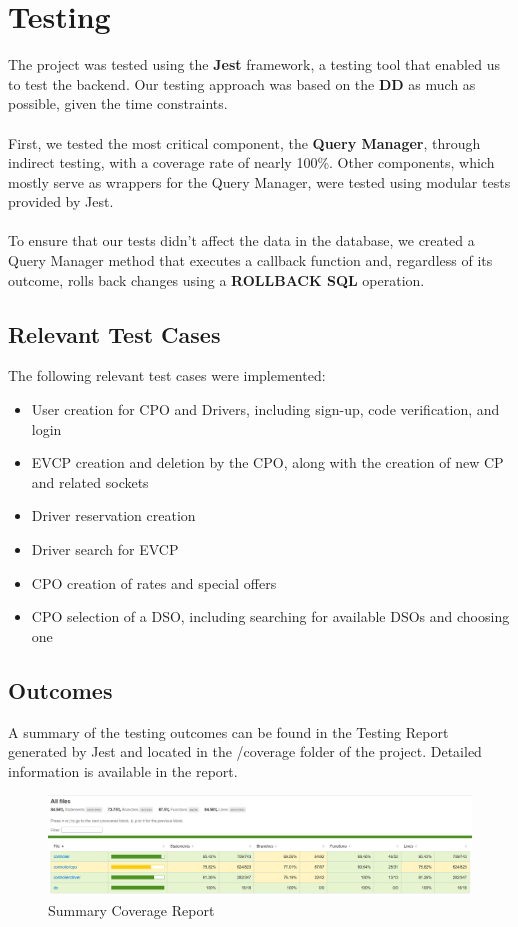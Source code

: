 \section{Testing}

The project was tested using the \textbf{Jest} framework, a testing tool that enabled us to test the backend.
Our testing approach was based on the \textbf{DD} as much as possible, given the time constraints.
\hfill \\ \hfill \\
First, we tested the most critical component, the \textbf{Query Manager}, through indirect testing,
with a coverage rate of nearly 100\%. Other components,
which mostly serve as wrappers for the Query Manager, were tested using modular tests provided by Jest.
\hfill \\ \hfill \\
To ensure that our tests didn't affect the data in the database,
we created a Query Manager method that executes a callback function and,
regardless of its outcome, rolls back changes using a \textbf{ROLLBACK SQL} operation.

\subsection{Relevant Test Cases}

The following relevant test cases were implemented:
\begin{itemize}
    \item User creation for CPO and Drivers, including sign-up, code verification, and login
    \item EVCP creation and deletion by the CPO, along with the creation of new CP and related sockets
    \item Driver reservation creation
    \item Driver search for EVCP
    \item CPO creation of rates and special offers
    \item CPO selection of a DSO, including searching for available DSOs and choosing one
\end{itemize}
\subsection{Outcomes}

A summary of the testing outcomes can be found in the Testing Report generated by Jest and located in the /coverage folder of the project. Detailed information is available in the report.

\begin{figure}[H]
    \centering
    \vspace{0.5cm}
    \hspace*{-1.5cm}
    \includegraphics[width = 1.2\textwidth]{src/coverage_report.png}
    \caption{Summary Coverage Report}
\end{figure}
